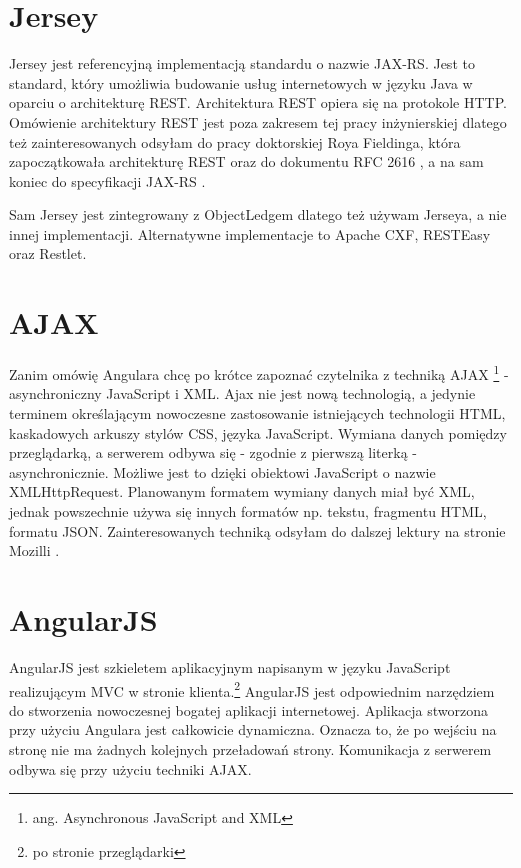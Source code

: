 \documentclass[a4paper,onecolumn,oneside,11pt,wide,floatssmall]{mwrep}
\theoremstyle{definition}
\theoremstyle{plain}%
\theoremstyle{remark}
\begin{document}
\section{Jersey}
\label{jersey}
Jersey jest referencyjną implementacją standardu o nazwie JAX-RS. Jest to standard, który umożliwia budowanie usług internetowych w języku Java w oparciu o architekturę REST. Architektura REST opiera się na protokole HTTP. Omówienie architektury REST jest poza zakresem tej pracy inżynierskiej dlatego też zainteresowanych odsyłam do pracy doktorskiej Roya Fieldinga, która zapoczątkowała architekturę REST \cite{Fielding2000} oraz do dokumentu RFC 2616 \cite{http-rfc}, a na sam koniec do specyfikacji JAX-RS \cite{jax-rs}.

Sam Jersey jest zintegrowany z ObjectLedgem dlatego też używam Jerseya, a nie innej implementacji. Alternatywne implementacje to Apache CXF, RESTEasy oraz Restlet.

\section{AJAX}
Zanim omówię Angulara chcę po krótce zapoznać czytelnika z techniką AJAX \footnote{ang. Asynchronous JavaScript and XML} - asynchroniczny JavaScript i XML. Ajax nie jest nową technologią, a jedynie terminem określającym nowoczesne zastosowanie istniejących technologii HTML, kaskadowych arkuszy stylów CSS, języka JavaScript. Wymiana danych pomiędzy przeglądarką, a serwerem odbywa się - zgodnie z pierwszą literką - asynchronicznie. Możliwe jest to dzięki obiektowi JavaScript o nazwie XMLHttpRequest\cite{XmlHttpRequest}. Planowanym formatem wymiany danych miał być XML, jednak powszechnie używa się innych formatów np. tekstu, fragmentu HTML, formatu JSON. Zainteresowanych techniką odsyłam do dalszej lektury na stronie Mozilli \cite{ajaxDocs}.

\section{AngularJS}
AngularJS \cite{angularHome} jest szkieletem aplikacyjnym napisanym w języku JavaScript realizującym MVC w stronie klienta.\footnote{po stronie przeglądarki} AngularJS jest odpowiednim narzędziem do stworzenia nowoczesnej bogatej aplikacji internetowej. Aplikacja stworzona przy użyciu Angulara jest całkowicie dynamiczna. Oznacza to, że po wejściu na stronę nie ma żadnych kolejnych przeładowań strony. Komunikacja z serwerem odbywa się przy użyciu techniki AJAX.
\end{document}
